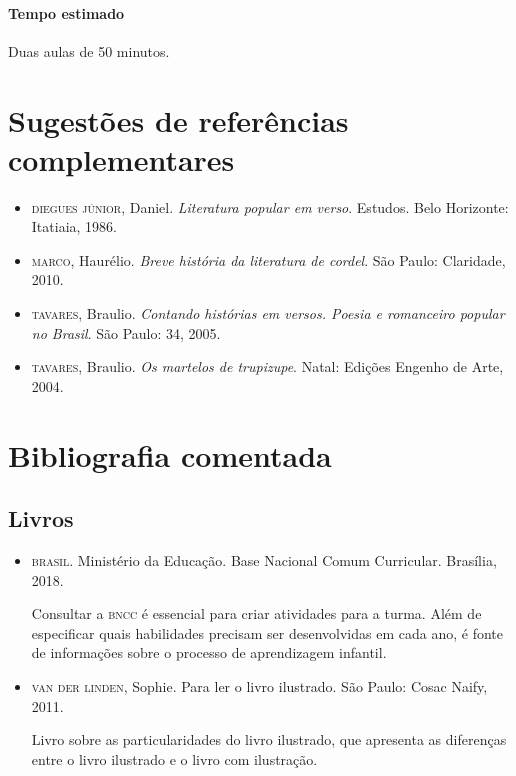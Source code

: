\documentclass[11pt]{extarticle}
\begin{document}
\paragraph{Tempo estimado} Duas aulas de 50 minutos.

\section{Sugestões de referências complementares}


\begin{itemize}
\item \textsc{diegues júnior}, Daniel. \textit{Literatura popular em verso}. Estudos. Belo Horizonte: Itatiaia, 1986. 

\item \textsc{marco}, Haurélio. \textit{Breve história da literatura de cordel}. São Paulo: Claridade, 2010.

\item \textsc{tavares}, Braulio. \textit{Contando histórias em versos. Poesia e romanceiro popular no Brasil}. São Paulo: 34, 2005.

\item \textsc{tavares}, Braulio. \textit{Os martelos de trupizupe}. Natal: Edições Engenho de Arte, 2004.
\end{itemize}

\section{Bibliografia comentada}

\subsection{Livros}

\begin{itemize}
\item \textsc{brasil}. Ministério da Educação. Base Nacional Comum Curricular. Brasília, 2018.

Consultar a \textsc{bncc} é essencial para criar atividades para a turma. Além de especificar 
quais habilidades precisam ser desenvolvidas em cada ano, é fonte de informações sobre 
o processo de aprendizagem infantil. 


\item \textsc{van der linden}, Sophie. Para ler o livro ilustrado. São Paulo: Cosac Naify, 2011.

Livro sobre as particularidades do livro ilustrado, que apresenta as diferenças entre o livro ilustrado e o livro com ilustração. 
\end{itemize}
\end{document}
